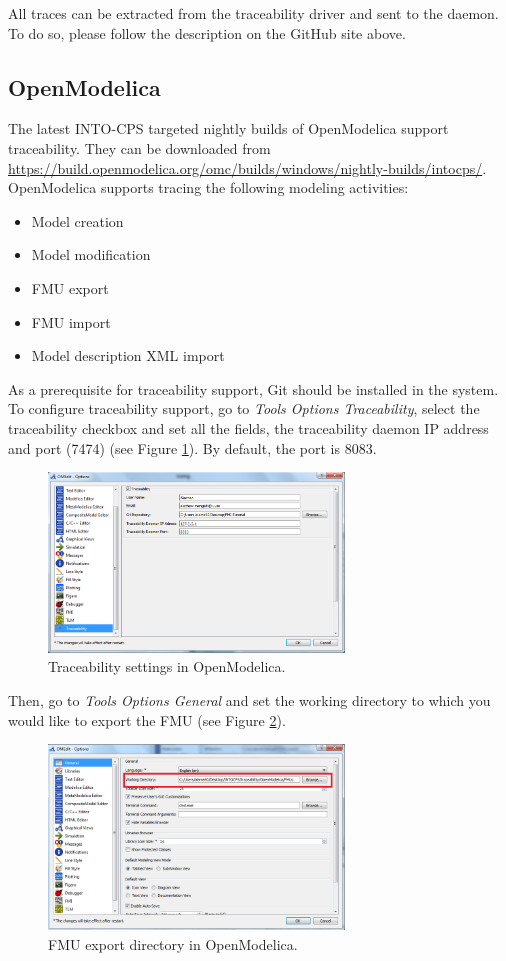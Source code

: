 All traces can be extracted from the traceability driver and sent to the daemon. To do so, please follow the description on the GitHub site above.
%
%
\subsection{OpenModelica}
%
The latest INTO-CPS targeted nightly builds of OpenModelica support traceability.  They can be downloaded from \url{https://build.openmodelica.org/omc/builds/windows/nightly-builds/intocps/}.  OpenModelica supports tracing the following modeling activities:
%
\begin{itemize}
	\item Model creation
  	\item Model modification
  	\item FMU export
	\item FMU import
  	\item Model description XML import
\end{itemize}
%
As a prerequisite for traceability support, Git should be installed in the system.
%
To configure traceability support, go to \emph{Tools \textrightarrow{} Options \textrightarrow{} Traceability}, select the traceability checkbox and set all the fields, the traceability daemon IP address and port (7474) (see Figure \ref{fig:OM_trace_config}). By default, the port is 8083.
%
\begin{figure}[htbp]
\centering
\includegraphics[width=0.7\textwidth]{figures/OM_trace01}
\caption{Traceability settings in OpenModelica.}
\label{fig:OM_trace_config}
\end{figure}
%
Then, go to \emph{Tools \textrightarrow{} Options \textrightarrow{} General} and set the working directory to which you would like to export the FMU (see Figure \ref{fig:OM_trace_config2}). 
%
\begin{figure}[htbp]
\centering
\includegraphics[width=0.7\textwidth]{figures/OM_trace02}
\caption{FMU export directory in OpenModelica.}
\label{fig:OM_trace_config2}
\end{figure}
